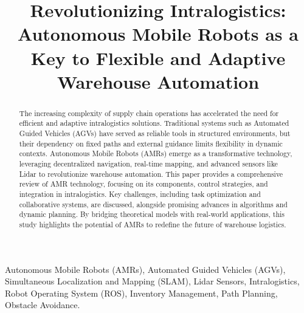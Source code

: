 \documentclass[conference]{IEEEtran}
\begin{document}
\title{Revolutionizing Intralogistics: Autonomous Mobile Robots as a Key to Flexible and Adaptive Warehouse Automation}

\author{
}

\maketitle

\begin{abstract}
The increasing complexity of supply chain operations has accelerated the need for efficient and adaptive intralogistics solutions. Traditional systems such as Automated Guided Vehicles (AGVs) have served as reliable tools in structured environments, but their dependency on fixed paths and external guidance limits flexibility in dynamic contexts. Autonomous Mobile Robots (AMRs) emerge as a transformative technology, leveraging decentralized navigation, real-time mapping, and advanced sensors like Lidar to revolutionize warehouse automation. This paper provides a comprehensive review of AMR technology, focusing on its components, control strategies, and integration in intralogistics. Key challenges, including task optimization and collaborative systems, are discussed, alongside promising advances in algorithms and dynamic planning. By bridging theoretical models with real-world applications, this study highlights the potential of AMRs to redefine the future of warehouse logistics.
\end{abstract}

\vspace{10pt}
\begin{IEEEkeywords}
Autonomous Mobile Robots (AMRs), Automated Guided Vehicles (AGVs), Simultaneous Localization and Mapping (SLAM), Lidar Sensors, Intralogistics, Robot Operating System (ROS), Inventory Management, Path Planning, Obstacle Avoidance.
\end{IEEEkeywords}
\end{document}

